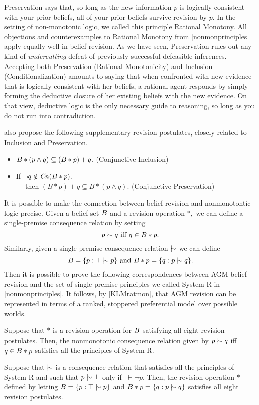 Preservation says that, so long as the new information $p$ is logically
consistent with your prior beliefs, all of your prior beliefs survive revision
by $p$. In the setting of non-monotonic logic, we called this principle Rational
Monotony. All objections and counterexamples to Rational Monotony from
\autoref{nonmonprinciples} apply equally well in belief revision. As we have
seen, Preservation rules out any kind of {\em undercutting} defeat of previously
successful defeasible inferences. Accepting both Preservation (Rational
Monotonicity) and Inclusion (Conditionalization) amounts to saying that when
confronted with new evidence that is logically consistent with her beliefs, a
rational agent responds by simply forming the deductive closure of her existing
beliefs with the new evidence. On that view, deductive logic is the only
necessary guide to reasoning, so long as you do not run into contradiction.

\citet{alchourron1985logic} also propose the following supplementary revision
postulates, closely related to Inclusion and Preservation. 
\begin{itemize}
\item[] $B*(p\wedge q) \subseteq (B*p)+q$. \hfill(Conjunctive Inclusion)
\item[] If $\neg q \notin \text{\textit{Cn}}(B*p),$ \\ $\phantom{M}$\hspace{1.5em} then
$(B*p)+q \subseteq B*(p \wedge q)$. \hfill(Conjunctive Preservation)
\end{itemize}
It is possible to make the connection between belief revision and nonmonotontic
logic precise. Given a belief set $B$ and a revision operation $*,$ we can
define a single-premise consequence relation by setting $$p\mathrel{\mid\hspace{-.08em}\!\sim} q \text{ iff } q
\in B*p.$$ Similarly, given a single-premise consequence relation $\mathrel{\mid\hspace{-.08em}\!\sim}$ we
can define $$B = \{ p : \top \mathrel{\mid\hspace{-.08em}\!\sim} p \} \text{ and } B * p = \{ q : p\mathrel{\mid\hspace{-.08em}\!\sim} q
\}.$$ Then it is possible to prove the following correspondences between AGM
belief revision and the set of single-premise principles we called System R in
\autoref{nonmonprinciples}. It follows, by \autoref{KLMratmon}, that AGM
revision can be represented in terms of a ranked, stoppered preferential model
over possible worlds.
\begin{theorem}
Suppose that $*$ is a revision operation for $B$ satisfying all eight
revision postulates. Then, the nonmonotonic consequence relation given by $p\mathrel{\mid\hspace{-.08em}\!\sim}
q$ iff $q\in B * p$ satisfies all the principles of System R. 
\end{theorem}
\begin{theorem}
Suppose that $\mathrel{\mid\hspace{-.08em}\!\sim}$ is a consequence relation that satisfies all the principles
of System R and such that $p\mathrel{\mid\hspace{-.08em}\!\sim} \bot$ only if $\;\vdash \neg p$. Then, the
revision operation $*$ defined by letting $B = \{ p : \top \mathrel{\mid\hspace{-.08em}\!\sim} p \}$ and
$B*p = \{ q : p\mathrel{\mid\hspace{-.08em}\!\sim} q \}$ satisfies all eight revision postulates.
\end{theorem}


